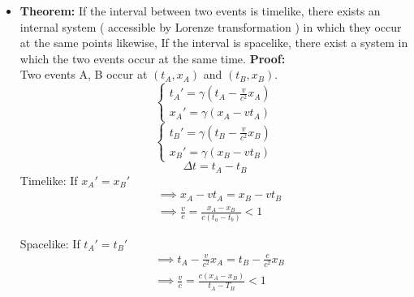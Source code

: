 \documentclass[fleqn,a4paper,12pt]{article}
\begin{document}
\begin{itemize}
\begin{itemize}
        \item 
          \textbf{Theorem:} If the interval between two events is timelike, there exists an internal system ( accessible by Lorenze transformation ) in which they occur at the same points likewise, If the interval is spacelike, there exist a system in which the two events occur at the same time.
          \textbf{Proof:} \\
          Two events A, B occur at $(t_A,x_A)$ and $(t_B,x_B)$.
          \[ 
            \begin{cases}
              t_A' = \gamma( t_A-\frac{v}{c^2}x_A )\\
              x_A' = \gamma( x_A - vt_A )
            \end{cases}
          \]
          \[ 
            \begin{cases}
              t_B' = \gamma( t_B-\frac{v}{c^2}x_B )\\
              x_B' = \gamma( x_B - vt_B )
            \end{cases}
          \]
          \[
            \Delta t = t_A -t_B
          \]
          Timelike: If $x_A' = x_B'$
          \begin{align*}            
            &\implies x_A - vt_A = x_B - vt_B \\
            &\implies \frac{v}{c} = \frac { x_A - x_B }{ c( t_a - t_b ) }  < 1 
          \end{align*}

          Spacelike: If $t_A' = t_B'$
          \begin{align*}            
            &\implies t_A - \frac{v}{c^2}x_A = t_B - \frac{c}{c^2}x_B \\
            &\implies \frac{v}{c} = \frac {c( x_A - x_B )}{ t_A - T_B } < 1 \\                          
          \end{align*}
          

            


    \end{itemize}

\end{itemize}
\end{document}
